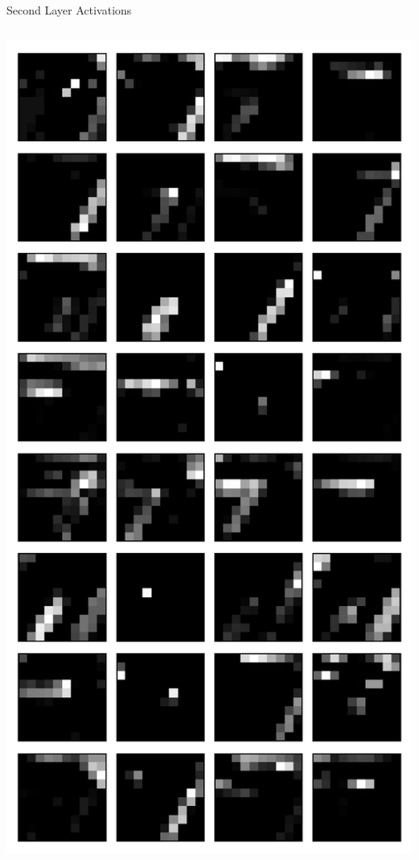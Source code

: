 \documentclass[10pt, aspectratio=169]{beamer} %
\begin{document}
\begin{frame}[fragile]{Second Layer Activations}
\begin{columns}
\includegraphics[width=\textwidth]{keras_l2_outputs.pdf}

\end{columns}
\end{frame}
\end{document}
